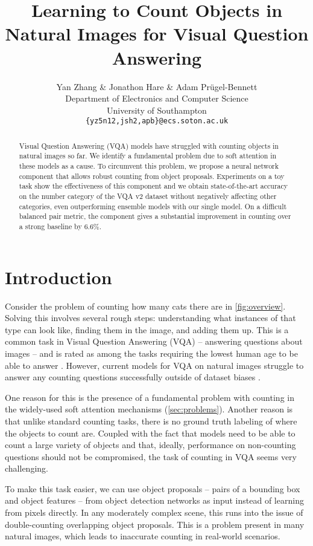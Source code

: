 \documentclass[letterpaper]{article}
\title{Learning to Count Objects in Natural Images for Visual Question Answering}
\author{Yan Zhang \& Jonathon Hare \& Adam Pr\"ugel-Bennett\\
Department of Electronics and Computer Science \\
University of Southampton\\
\texttt{\{yz5n12,jsh2,apb\}@ecs.soton.ac.uk}
}
\begin{document}
\maketitle


\begin{abstract}
    Visual Question Answering (VQA) models have struggled with counting objects in natural images so far.
    We identify a fundamental problem due to soft attention in these models as a cause.
    To circumvent this problem, we propose a neural network component that allows robust counting from object proposals.
    Experiments on a toy task show the effectiveness of this component and we obtain state-of-the-art accuracy on the number category of the VQA v2 dataset without negatively affecting other categories, even outperforming ensemble models with our single model.
    On a difficult balanced pair metric, the component gives a substantial improvement in counting over a strong baseline by 6.6\%.
\end{abstract}

\section{Introduction}\label{sec:intro}
Consider the problem of counting how many cats there are in \autoref{fig:overview}.
Solving this involves several rough steps: understanding what instances of that type can look like, finding them in the image, and adding them up.
This is a common task in Visual Question Answering (VQA) -- answering questions about images -- and is rated as among the tasks requiring the lowest human age to be able to answer \citep{Agrawal2015a}.
However, current models for VQA on natural images struggle to answer any counting questions successfully outside of dataset biases \citep{Jabri2016a}.

One reason for this is the presence of a fundamental problem with counting in the widely-used soft attention mechanisms (\autoref{sec:problems}).
Another reason is that unlike standard counting tasks, there is no ground truth labeling of where the objects to count are.
Coupled with the fact that models need to be able to count a large variety of objects and that, ideally, performance on non-counting questions should not be compromised, the task of counting in VQA seems very challenging.

To make this task easier, we can use object proposals -- pairs of a bounding box and object features -- from object detection networks as input instead of learning from pixels directly.
In any moderately complex scene, this runs into the issue of double-counting overlapping object proposals.
This is a problem present in many natural images, which leads to inaccurate counting in real-world scenarios.
\end{document}
